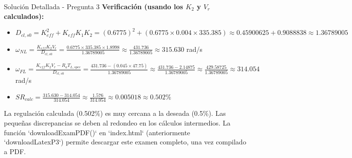 \documentclass[12pt]{article}
\begin{document}
\begin{solutionbox}{Solución Detallada - Pregunta 3}
\textbf{Verificación (usando los $K_2$ y $V_r$ calculados):}
\begin{itemize}
    \item $D_{cl,s0} = K_{eff}^2 + K_{eff}K_1K_2 = (0.6775)^2 + (0.6775 \times 0.004 \times 335.385) \approx 0.45900625 + 0.9088838 \approx 1.36789005$
    \item $\omega_{NL} = \frac{K_{eff}K_2 V_r}{D_{cl,s0}} = \frac{0.6775 \times 335.385 \times 1.8998}{1.36789005} \approx \frac{431.736}{1.36789005} \approx 315.630$ rad/s
    \item $\omega_{FL} = \frac{K_{eff}K_2 V_r - R_a T_{L,spec}}{D_{cl,s0}} = \frac{431.736 - (0.045 \times 47.75)}{1.36789005} \approx \frac{431.736 - 2.14875}{1.36789005} \approx \frac{429.58725}{1.36789005} \approx 314.054$ rad/s
    \item $SR_{calc} = \frac{315.630 - 314.054}{314.054} \approx \frac{1.576}{314.054} \approx 0.005018 \approx \mathbf{0.502\%}$
\end{itemize}
La regulación calculada (0.502\%) es muy cercana a la deseada (0.5\%). Las pequeñas discrepancias se deben al redondeo en los cálculos intermedios.\n
La función `downloadExamPDF()` en `index.html` (anteriormente `downloadLatexP3`) permite descargar este examen completo, una vez compilado a PDF.\n

\end{solutionbox}

\newpage
\end{document}
